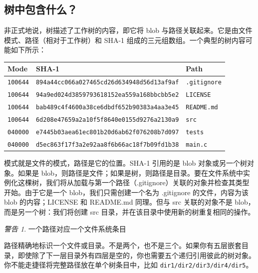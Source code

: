 \documentclass{ctexart}
\theoremstyle{remark}
\theoremstyle{warningstyle}
\newtheorem*{warning}{警告} %
\theoremstyle{warningstyle}
\begin{document}
\subsection{树中包含什么？}
非正式地说，树描述了工作树的内容，即它将 blob 与路径关联起来。它是由文件模式、路径（相对于工作树）和 SHA-1 组成的三元组数组。一个典型的树内容可能如下所示：
\begin{table}[H]
\centering
\begin{tabular}{l l l}
\toprule
\textbf{Mode} & \textbf{SHA-1} & \textbf{Path} \\
\midrule
\lstinline|100644| & \lstinline|894a44cc066a027465cd26d634948d56d13af9af| & \lstinline|.gitignore| \\
\lstinline|100644| & \lstinline|94a9ed024d3859793618152ea559a168bbcbb5e2| & \lstinline|LICENSE| \\
\lstinline|100644| & \lstinline|bab489c4f4600a38ce6dbdf652b90383a4aa3e45| & \lstinline|README.md| \\
\lstinline|100644| & \lstinline|6d208e47659a2a10f5f8640e0155d9276a2130a9| & \lstinline|src| \\
\lstinline|040000| & \lstinline|e7445b03aea61ec801b20d6ab62f076208b7d097| & \lstinline|tests| \\
\lstinline|040000| & \lstinline|d5ec863f17f3a2e92aa8f6b66ac18f7b09fd1b38| & \lstinline|main.c| \\
\bottomrule
\end{tabular}
\end{table}
模式就是文件的模式，路径是它的位置。SHA-1 引用的是 blob 对象或另一个树对象。如果是 blob，则路径是文件；如果是树，则路径是目录。要在文件系统中实例化这棵树，我们将从加载与第一个路径（.gitignore）关联的对象并检查其类型开始。由于它是一个 blob，我们只需创建一个名为 .gitignore 的文件，内容为该 blob 的内容；LICENSE 和 README.md 同理。但与 src 关联的对象不是 blob，而是另一个树：我们将创建 src 目录，并在该目录中使用新的树重复相同的操作。
\begin{warning}
    一个路径对应一个文件系统条目

    路径精确地标识一个文件或目录。不是两个，也不是三个。如果你有五层嵌套目录，即使除了下一层目录外有四层是空的，你也需要五个递归引用彼此的树对象。你不能走捷径将完整路径放在单个树条目中，比如 \lstinline|dir1/dir2/dir3/dir4/dir5|。\end{warning}
\end{document}
